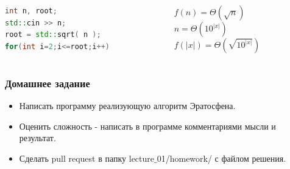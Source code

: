 \documentclass[russian, 12pt]{beamer}
\begin{document}
\lstset{style=mystyle}
\begin{frame}[fragile]
\begin{columns}[T] %
\begin{column}{.48\textwidth}
\begin{lstlisting}[language=C++]
int n, root;
std::cin >> n;
root = std::sqrt( n );
for(int i=2;i<=root;i++)
\end{lstlisting}
\end{column}%
\hfill%
\begin{column}{.48\textwidth}
$f(n) = \Theta( \sqrt{n} )$\\[0.3cm]
\pause
$n = \Theta( 10^{|x|} )$\\[0.3cm]
\pause
$f(|x|) = \Theta\left( \sqrt{10^{|x|}} \right)$
\end{column}%
\end{columns} 
\end{frame}
\begin{frame}
\frametitle{Домашнее задание}
\begin{itemize}
  \item Написать программу реализующую алгоритм Эратосфена.
  \item Оценить сложность - написать в программе комментариями мысли и результат.
  \item Сделать pull request в папку lecture$\_$01/homework/ с файлом решения.
\end{itemize}
\end{frame}
\end{document}
